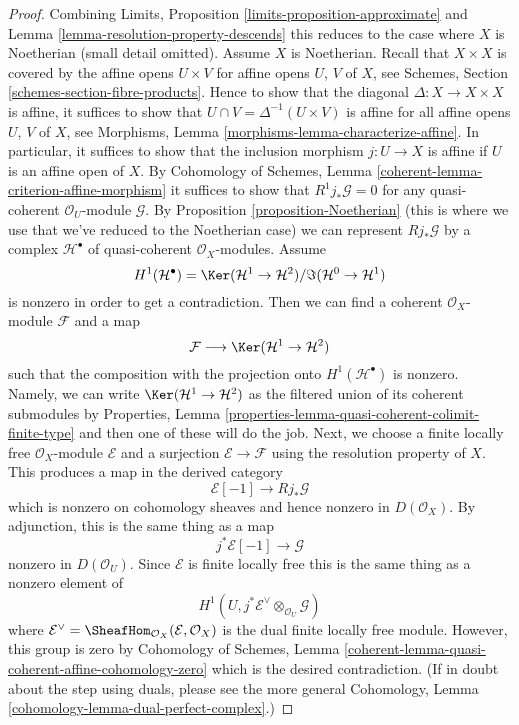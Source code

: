 \begin{proof}
Combining Limits, Proposition \ref{limits-proposition-approximate}
and Lemma \ref{lemma-resolution-property-descends}
this reduces to the case where $X$ is Noetherian (small detail omitted).
Assume $X$ is Noetherian.
Recall that $X \times X$ is covered by the affine opens
$U \times V$ for affine opens $U$, $V$ of $X$, see
Schemes, Section \ref{schemes-section-fibre-products}.
Hence to show that the diagonal $\Delta : X \to X \times X$
is affine, it suffices to show that $U \cap V = \Delta^{-1}(U \times V)$
is affine for all affine opens $U$, $V$ of $X$, see
Morphisms, Lemma \ref{morphisms-lemma-characterize-affine}.
In particular, it suffices to show that the inclusion morphism
$j : U \to X$ is affine if $U$ is an affine open of $X$.
By Cohomology of Schemes, Lemma \ref{coherent-lemma-criterion-affine-morphism}
it suffices to show that $R^1j_*\mathcal{G} = 0$ for any
quasi-coherent $\mathcal{O}_U$-module $\mathcal{G}$.
By Proposition \ref{proposition-Noetherian} (this is where we use
that we've reduced to the Noetherian case)
we can represent $Rj_*\mathcal{G}$ by a complex
$\mathcal{H}^\bullet$ of quasi-coherent $\mathcal{O}_X$-modules.
Assume
$$
H^1(\mathcal{H}^\bullet) =
\Ker(\mathcal{H}^1 \to \mathcal{H}^2)/\Im(\mathcal{H}^0 \to \mathcal{H}^1)
$$
is nonzero in order to get a contradiction. Then we can find a coherent
$\mathcal{O}_X$-module $\mathcal{F}$ and a map
$$
\mathcal{F} \longrightarrow
\Ker(\mathcal{H}^1 \to \mathcal{H}^2)
$$
such that the composition with the projection onto $H^1(\mathcal{H}^\bullet)$
is nonzero. Namely, we can write $\Ker(\mathcal{H}^1 \to \mathcal{H}^2)$
as the filtered union of its coherent submodules by
Properties, Lemma \ref{properties-lemma-quasi-coherent-colimit-finite-type}
and then one of these will do the job.
Next, we choose a finite locally free $\mathcal{O}_X$-module
$\mathcal{E}$ and a surjection $\mathcal{E} \to \mathcal{F}$ using
the resolution property of $X$.
This produces a map in the derived category
$$
\mathcal{E}[-1] \longrightarrow Rj_*\mathcal{G}
$$
which is nonzero on cohomology sheaves and hence nonzero in $D(\mathcal{O}_X)$.
By adjunction, this is the same thing as a map
$$
j^*\mathcal{E}[-1] \to \mathcal{G}
$$
nonzero in $D(\mathcal{O}_U)$. Since $\mathcal{E}$ is finite locally
free this is the same thing as a nonzero element of
$$
H^1(U, j^*\mathcal{E}^\vee \otimes_{\mathcal{O}_U} \mathcal{G})
$$
where
$\mathcal{E}^\vee = \SheafHom_{\mathcal{O}_X}(\mathcal{E}, \mathcal{O}_X)$
is the dual finite locally free module. However, this group is zero by
Cohomology of Schemes, Lemma
\ref{coherent-lemma-quasi-coherent-affine-cohomology-zero}
which is the desired contradiction.
(If in doubt about the step using duals, please see the more general
Cohomology, Lemma \ref{cohomology-lemma-dual-perfect-complex}.)
\end{proof}






